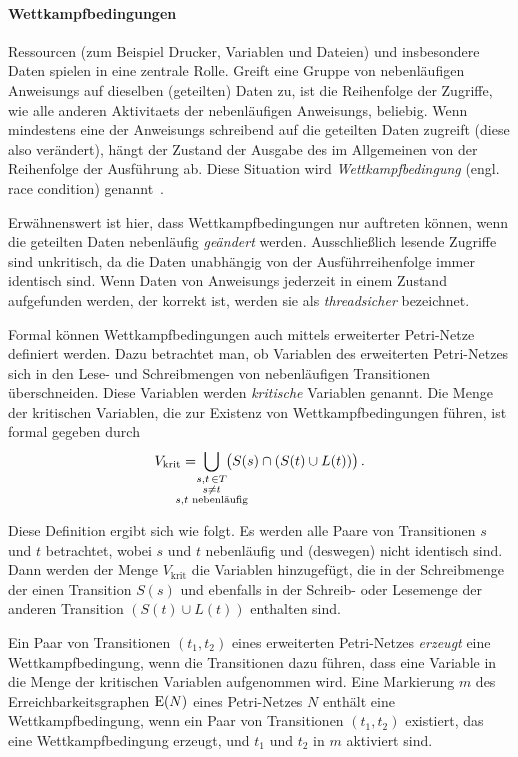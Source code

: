 \paragraph{Wettkampfbedingungen}
Ressourcen (zum Beispiel Drucker, Variablen und Dateien) und insbesondere Daten spielen in  eine zentrale Rolle. Greift eine Gruppe von nebenläufigen \glspl{Anweisung} auf dieselben (geteilten) Daten zu, ist die Reihenfolge der Zugriffe, wie alle anderen \glspl{Aktivitaet} der nebenläufigen \glspl{Anweisung}, beliebig. Wenn mindestens eine der \glspl{Anweisung} schreibend auf die geteilten Daten zugreift (diese also verändert), hängt der Zustand der Ausgabe des  im Allgemeinen von der Reihenfolge der Ausführung ab. Diese Situation wird \emph{Wettkampfbedingung} (engl. race condition) genannt~\cite{Hettel2016}. 

Erwähnenswert ist hier, dass Wettkampfbedingungen nur auftreten können, wenn die geteilten Daten nebenläufig \emph{geändert} werden. Ausschließlich lesende Zugriffe sind unkritisch, da die Daten unabhängig von der Ausführreihenfolge immer identisch sind. Wenn Daten von \glspl{Anweisung} jederzeit in einem Zustand aufgefunden werden, der korrekt ist, werden sie als \emph{threadsicher} bezeichnet.

Formal können Wettkampfbedingungen auch mittels erweiterter Petri-Netze definiert werden. Dazu betrachtet man, ob Variablen des erweiterten Petri-Netzes sich in den Lese- und Schreibmengen von nebenläufigen Transitionen überschneiden. Diese Variablen werden \emph{kritische} Variablen genannt. Die Menge der kritischen Variablen, die zur Existenz von Wettkampfbedingungen führen, ist formal gegeben durch
\begin{align*}
	V_\text{krit} = \;\bigcup_{\mathclap{\substack{s,t\, \in T\\s \neq t\\s, t \text{ nebenläufig}}}} \;\left( \strut{S(s) \cap (S(t) \cup L(t))}\right).
\end{align*}

Diese Definition ergibt sich wie folgt. Es werden alle Paare von Transitionen $s$ und $t$ betrachtet, wobei $s$ und $t$ nebenläufig und (deswegen) nicht identisch sind. Dann werden der Menge $V_\text{krit}$ die Variablen hinzugefügt, die in der Schreibmenge der einen Transition $S(s)$ und ebenfalls in der Schreib- oder Lesemenge der anderen Transition $(S(t) \cup L(t))$ enthalten sind.

Ein Paar von Transitionen $(t_1, t_2)$ eines erweiterten Petri-Netzes \emph{erzeugt} eine Wettkampfbedingung, wenn die Transitionen dazu führen, dass eine Variable in die Menge der kritischen Variablen aufgenommen wird. Eine Markierung $m$ des Erreichbarkeitsgraphen $\operatorname{E}(N)$ eines Petri-Netzes $N$ enthält eine Wettkampfbedingung, wenn ein Paar von Transitionen $(t_1, t_2)$ existiert, das eine Wettkampfbedingung erzeugt, und $t_1$ und $t_2$ in $m$ aktiviert sind.


